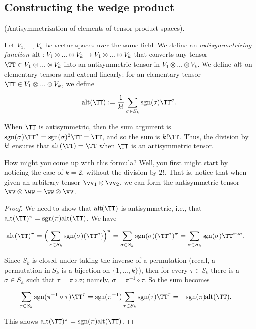 \subsection*{Constructing the wedge product}

\begin{defn}
    (Antisymmetrization of elements of tensor product spaces).
    
    Let $V_1, ..., V_k$ be vector spaces over the same field. We define an \textit{antisymmetrizing function} ${\text{alt}:V_1 \otimes ... \otimes V_k \rightarrow V_1 \otimes ... \otimes V_k}$ that converts any tensor $\TT \in V_1 \otimes ... \otimes V_k$ into an antisymmetric tensor in $V_1 \otimes ... \otimes V_k$. We define $\text{alt}$ on elementary tensors and extend linearly: for an elementary tensor $\TT \in V_1 \otimes ... \otimes V_k$, we define
    
    \begin{align*}
        \alt(\TT) := \frac{1}{k!} \sum_{\sigma \in S_k} \sgn(\sigma) \TT^\sigma.
    \end{align*}
    
    When $\TT$ is antisymmetric, then the sum argument is $\sgn(\sigma) \TT^\sigma = \sgn(\sigma)^2 \TT = \TT$, and so the sum is $k! \TT$. Thus, the division by $k!$ ensures that $\alt(\TT) = \TT$ when $\TT$ is an antisymmetric tensor.
    
    How might you come up with this formula? Well, you first might start by noticing the case of $k = 2$, without the division by $2!$. That is, notice that when given an arbitrary tensor $\vv_1 \otimes \vv_2$, we can form the antisymmetric tensor $\vv \otimes \ww - \ww \otimes \vv$.
\end{defn}

\begin{proof}
    We need to show that $\alt(\TT)$ is antisymmetric, i.e., that $\alt(\TT)^\pi = \sgn(\pi) \alt(\TT)$. We have
            
    \begin{align*}
        \alt(\TT)^\pi &= \Big(\sum_{\sigma \in S_k} \sgn(\sigma) (\TT^\sigma)\Big)^\pi = \sum_{\sigma \in S_k} \sgn(\sigma) (\TT^\sigma)^\pi = \sum_{\sigma \in S_k} \sgn(\sigma) \TT^{\pi \circ \sigma}.
    \end{align*}
            
    Since $S_k$ is closed under taking the inverse of a permutation (recall, a permutation in $S_k$ is a bijection on $\{1, ..., k\}$), then for every $\tau \in S_k$ there is a $\sigma \in S_k$ such that $\tau = \pi \circ \sigma$; namely, $\sigma = \pi^{-1} \circ \tau$. So the sum becomes
            
    \begin{align*}
        \sum_{\tau \in S_k} \sgn(\pi^{-1} \circ \tau) \TT^\tau &= \sgn(\pi^{-1}) \sum_{\tau \in S_k} \sgn(\tau) \TT^\tau = -\sgn(\pi) \alt(\TT).
    \end{align*}
    
    This shows $\alt(\TT)^\pi = \sgn(\pi) \alt(\TT)$.
\end{proof}

